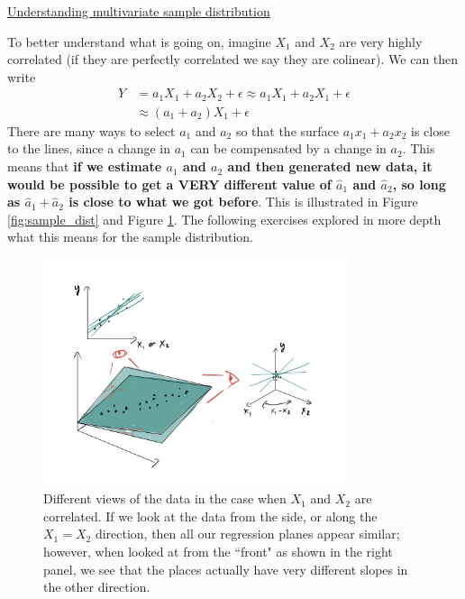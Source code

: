 \begin{example}
\href{https://colab.research.google.com/drive/1oIRgP_7-c5DGV1D2iz5nj406mZfJxUIG#scrollTo=h_vbLZqWPNzD&line=1&uniqifier=1}{Understanding multivariate sample distribution}
\end{example}


To better understand what is going on, imagine $X_1$ and $X_2$ are very highly correlated (if they are perfectly correlated we say they are {\dfn colinear}). We can then write 
\begin{align}
Y &= a_1X_1 + a_2X_2 + \epsilon  \approx a_1X_1 + a_2X_1 + \epsilon\\
 &\approx (a_1+a_2)X_1 + \epsilon
\end{align}
There are many ways to select $a_1$ and $a_2$ so that the surface $a_1x_1+a_2x_2$ is close to the lines, since a change in $a_1$ can be compensated by a change in $a_2$. This means that {\bf if we estimate $a_1$ and $a_2$ and then generated new data, it would be possible to get a VERY different value of $\hat{a}_1$ and $\hat{a}_2$, so long as $\hat{a}_1 + \hat{a}_2$ is close to what we got before}. This is illustrated in Figure \ref{fig:sample_dist} and Figure \ref{fig:sample_dist2}. The following exercises explored in more depth what this means for the sample distribution. 

\begin{figure}[h]
    \centering
    \includegraphics[width=0.8\textwidth]{sample_dist2}
    \caption{Different views of the data in the case when $X_1$ and $X_2$ are correlated. If we look at the data from the side, or along the $X_1=X_2$ direction, then all our regression planes appear similar; however, when looked at from the ``front" as shown in the right panel, we see that the places actually have very different slopes in the other direction.  }
    \label{fig:sample_dist2}
\end{figure}




